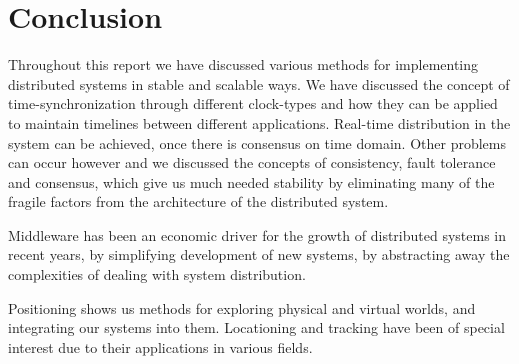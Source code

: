 


\chapter{Conclusion} \label{ch:conclussion}
Throughout this report we have discussed various methods for implementing distributed systems in stable and scalable ways. We have discussed the concept of time-synchronization through different clock-types and how they can be applied to maintain timelines between different applications. Real-time distribution in the system can be achieved, once there is consensus on time domain. Other problems can occur however and we discussed the concepts of consistency, fault tolerance and consensus, which give us much needed stability by eliminating many of the fragile factors from the architecture of the distributed system.

Middleware has been an economic driver for the growth of distributed systems in recent years, by simplifying development of new systems, by abstracting away the complexities of dealing with system distribution.

Positioning shows us methods for exploring physical and virtual worlds, and integrating our systems into them. Locationing and tracking have been of special interest due to their applications in various fields.


